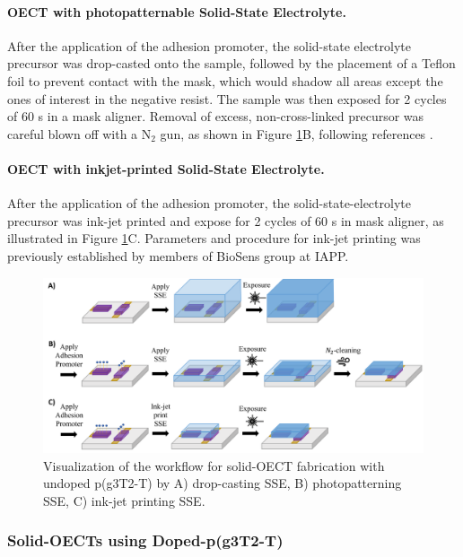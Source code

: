 \paragraph{OECT with photopatternable Solid-State Electrolyte.}After the application of the adhesion promoter, the solid-state electrolyte precursor was drop-casted onto the sample, followed by the placement of a Teflon foil to prevent contact with the mask, which would shadow all areas except the ones of interest in the negative resist. The sample was then exposed for 2 cycles of 60 s in a mask aligner. Removal of excess, non-cross-linked precursor was careful blown off with a N$_{2}$ gun, as shown in Figure \ref{fig:undopedsse}B,  following references \cite{weissbachPhotopatternableSolidElectrolyte2022}\cite{bongartzOrganicElectrochemicalTransistors2021}.

\paragraph{OECT with inkjet-printed Solid-State Electrolyte.}After the application of the adhesion promoter, the solid-state-electrolyte precursor was ink-jet printed and expose for 2 cycles of 60 s in mask aligner, as illustrated in Figure \ref{fig:undopedsse}C. Parameters and procedure for ink-jet printing was previously established by members of BioSens group at IAPP. 

\begin{figure}[!ht]
	\centering
	\includegraphics[width=\textwidth]{Images/pdf/undoped-sse.pdf}
	\caption[Solid-OECT fabrication with undoped p(g3T2-T)]{Visualization of the workflow for solid-OECT fabrication with undoped p(g3T2-T) by A) drop-casting SSE, B) photopatterning SSE, C) ink-jet printing SSE.}
	\label{fig:undopedsse}
\end{figure}

\subsubsection{Solid-OECTs using Doped-p(g3T2-T)}

